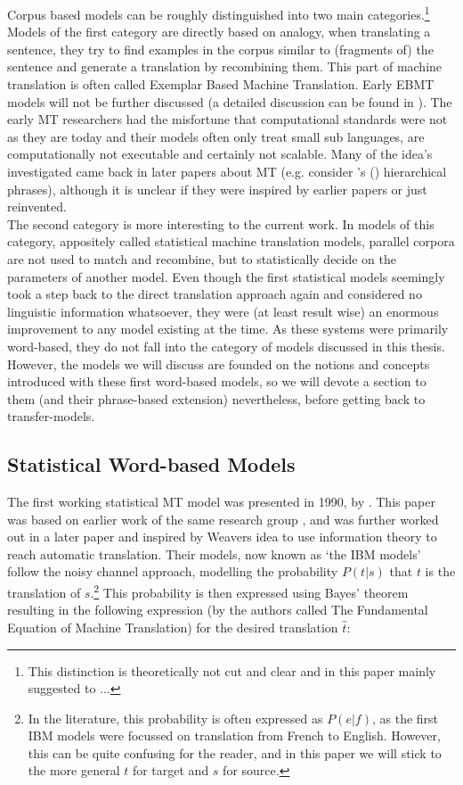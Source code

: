 \documentclass{report}
\theoremstyle{definition}
\theoremstyle{plain}
\def\citepos#1{\citeauthor{#1}'s (\citeyear{#1})}
\begin{document}
Corpus based models can be roughly distinguished into two main categories.\footnote{This distinction is theoretically not cut and clear and in this paper mainly suggested to ...} Models of the first category are directly based on analogy, when translating a sentence, they try to find examples in the corpus similar to (fragments of) the sentence and generate a translation by recombining them. This part of machine translation is often called Exemplar Based Machine Translation. Early EBMT models will not be further discussed (a detailed discussion can be found in \cite{somers1999review}). The early MT researchers had the misfortune that computational standards were not as they are today and their models often only treat small sub languages, are computationally not executable and certainly not scalable. Many of the idea's investigated came back in later papers about MT (e.g. consider \citepos{furuse1992example} hierarchical phrases), although it is unclear if they were inspired by earlier papers or just reinvented.\\
The second category is more interesting to the current work. In models of this category, appositely called statistical machine translation models, parallel corpora are not used to match and recombine, but to statistically decide on the parameters of another model. Even though the first statistical models seemingly took a step back to the direct translation approach again and considered no linguistic information whatsoever, they were (at least result wise) an enormous improvement to any model existing at the time. As these systems were primarily word-based, they do not fall into the category of models discussed in this thesis. However, the models we will discuss are founded on the notions and concepts introduced with these first word-based models, so we will devote a section to them (and their phrase-based extension) nevertheless, before getting back to transfer-models.

\subsection{Statistical Word-based Models}

The first working statistical MT model was presented in 1990, by \cite{brown1990statistical}. This paper was based on earlier work of the same research group \citep{brown1988statistical}, and was further worked out in a later paper \citep{brown1993mathematics} and inspired by Weavers idea \citep{weaver1955translation} to use information theory to reach automatic translation. Their models, now known as `the IBM models' follow the noisy channel approach, modelling the probability $P(t|s)$ that $t$ is the translation of $s$.\footnote{In the literature, this probability is often expressed as $P(e|f)$, as the first IBM models were focussed on translation from French to English. However, this can be quite confusing for the reader, and in this paper we will stick to the more general $t$ for target and $s$ for source.} This probability is then expressed using Bayes' theorem resulting in the following expression (by the authors called The Fundamental Equation of Machine Translation) for the desired translation $\hat{t}$:
\end{document}
